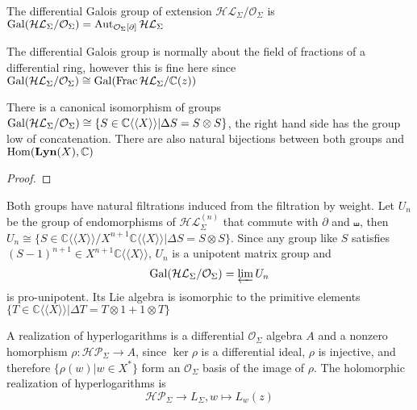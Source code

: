\documentclass[main]{subfiles}
\begin{document}
\begin{definition}
The differential Galois group of extension $\mathcal{HL}_\Sigma/\mathcal O_\Sigma$ is $\operatorname{Gal}(\mathcal{HL}_\Sigma/\mathcal O_\Sigma)=\operatorname{Aut}_{\mathcal O_\Sigma[\partial]}\mathcal {HL}_\Sigma$
\end{definition}

\begin{note}
The differential Galois group is normally about the field of fractions of a differential ring, however this is fine here since $\operatorname{Gal}(\mathcal{HL}_\Sigma/\mathcal O_\Sigma)\cong\operatorname{Gal}(\operatorname{Frac}\mathcal{HL}_\Sigma/\mathbb C(z))$
\end{note}

\begin{theorem}
There is a canonical isomorphism of groups $\operatorname{Gal}(\mathcal{HL}_\Sigma/\mathcal O_\Sigma)\cong\{S\in\mathbb C\langle\langle X\rangle\rangle|\Delta S=S\otimes S\}$, the right hand side has the group low of concatenation. There are also natural bijections between both groups and $\operatorname{Hom}(\mathbf{Lyn}(X),\mathbb C)$
\end{theorem}

\begin{proof}

\end{proof}

Both groups have natural filtrations induced from the filtration by weight. Let $U_n$ be the group of endomorphisms of $\mathcal{HL}_\Sigma^{(n)}$ that commute with $\partial$ and $\shuffle$, then $U_n\cong\{S\in\mathbb C\langle\langle X\rangle\rangle/X^{n+1}\mathbb C\langle\langle X\rangle\rangle|\Delta S=S\otimes S\}$. Since any group like $S$ satisfies $(S-1)^{n+1}\in X^{n+1}\mathbb C\langle\langle X\rangle\rangle$, $U_n$ is a unipotent matrix group and
\[\operatorname{Gal}(\mathcal{HL}_\Sigma/\mathcal O_\Sigma)=\varprojlim U_n\]
is pro-unipotent. Its Lie algebra is isomorphic to the primitive elements $\{T\in\mathbb C\langle\langle X\rangle\rangle|\Delta T=T\otimes 1+1\otimes T\}$

\begin{definition}
A realization of hyperlogarithms is a differential $\mathcal O_\Sigma$ algebra $A$ and a nonzero homorphism $\rho:\mathcal{HP}_\Sigma\to A$, since $\ker\rho$ is a differential ideal, $\rho$ is injective, and therefore $\{\rho(w)|w\in X^*\}$ form an $\mathcal O_\Sigma$ basis of the image of $\rho$. The holomorphic realization of hyperlogarithms is
\[\mathcal{HP}_\Sigma\to L_\Sigma,w\mapsto L_w(z)\]
\end{definition}
\end{document}
